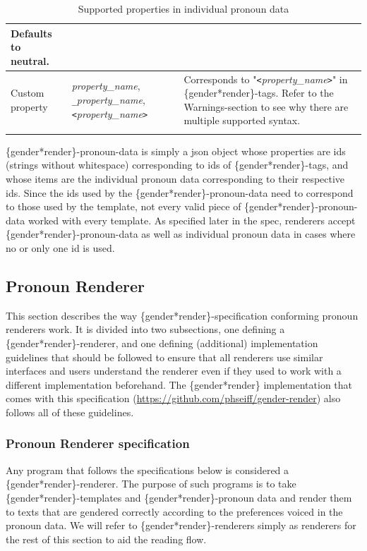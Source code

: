 \documentclass{article}
\begin{document}
\begin{flushleft}
\begin{center}
\begin{longtable}{|>{\raggedright\arraybackslash}p{7em} | >{\raggedright\arraybackslash}p{9em} | >{\raggedright\arraybackslash}p{14em} |}
                 Defaults to neutral.\\
                 \hline
                 \hline
                 Custom property & \emph{property\_name}, \texttt{\_}\emph{property\_name}, \texttt{<}\emph{property\_name}\texttt{>} & Corresponds to "\texttt{<}\emph{property\_name}\texttt{>}" in \{gender*render\}-tags.
                 Refer to the Warnings-section to see why there are multiple supported syntax.\\
                 \hline
                \caption{Supported properties in individual pronoun data}
            \end{longtable}
        \end{center}
    \end{flushleft}

    \{gender*render\}-pronoun-data is simply a json object whose properties are ids (strings without whitespace) corresponding to ids of \{gender*render\}-tags, and whose items are the individual pronoun data corresponding to their respective ids.
    Since the ids used by the \{gender*render\}-pronoun-data need to correspond to those used by the template, not every valid piece of \{gender*render\}-pronoun-data worked with every template.
    As specified later in the spec, renderers accept \{gender*render\}-pronoun-data as well as individual pronoun data in cases where no or only one id is used.

    \subsection{Pronoun Renderer}

    This section describes the way \{gender*render\}-specification conforming pronoun renderers work.
    It is divided into two subsections, one defining a \{gender*render\}-renderer, and one defining (additional) implementation guidelines that should be followed to ensure that all renderers use similar interfaces and users understand the renderer even if they used to work with a different implementation beforehand.
    The \{gender*render\} implementation that comes with this specification (\url{https://github.com/phseiff/gender-render}) also follows all of these guidelines.

    \subsubsection{Pronoun Renderer specification}

    Any program that follows the specifications below is considered a \{gender*render\}-renderer.
    The purpose of such programs is to take \{gender*render\}-templates and \{gender*render\}-pronoun data and render them to texts that are gendered correctly according to the preferences voiced in the pronoun data.
    We will refer to \{gender*render\}-renderers simply as renderers for the rest of this section to aid the reading flow.\\
\end{document}
